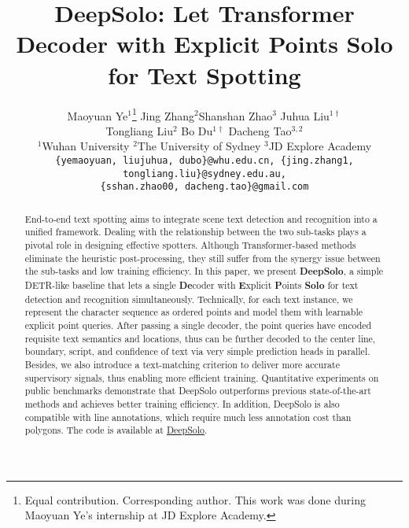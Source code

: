 \documentclass[10pt,twocolumn,letterpaper]{article}
\newcommand{\authorskip}{\hspace{8mm}}
\begin{document}
\title{
DeepSolo: Let Transformer Decoder with Explicit Points Solo for Text Spotting
}

\author{
  Maoyuan Ye$^{1}$\thanks{Equal contribution. \dag Corresponding author. This work was done during Maoyuan Ye's internship at JD Explore Academy.} \authorskip Jing Zhang$^{2}$\footnotemark[1] \authorskip Shanshan Zhao$^{3}$ \authorskip Juhua Liu$^{1\dag}$\\
  Tongliang Liu$^{2}$ \authorskip Bo Du$^{1\dag}$ \authorskip Dacheng Tao$^{3,2}$\\
  $^{1}$Wuhan University \quad $^{2}$The University of Sydney \quad $^{3}$JD Explore Academy\\
  {\tt\small \{yemaoyuan, liujuhua, dubo\}@whu.edu.cn, \{jing.zhang1, tongliang.liu\}@sydney.edu.au,}\\
  {\tt\small \{sshan.zhao00, dacheng.tao\}@gmail.com}
}

\maketitle

\begin{abstract}
   End-to-end text spotting aims to integrate scene text detection and recognition into a unified framework. Dealing with the relationship between the two sub-tasks plays a pivotal role in designing effective spotters. Although Transformer-based methods eliminate the heuristic post-processing, they still suffer from the synergy issue between the sub-tasks and low training efficiency. In this paper, we present \textbf{DeepSolo}, a simple DETR-like baseline that lets a single \textbf{De}coder with \textbf{E}xplicit \textbf{P}oints \textbf{Solo} for text detection and recognition simultaneously. Technically, for each text instance, we represent the character sequence as ordered points and model them with learnable explicit point queries. After passing a single decoder, the point queries have encoded requisite text semantics and locations, thus can be further decoded to the center line, boundary, script, and confidence of text via very simple prediction heads in parallel. Besides, we also introduce a text-matching criterion to deliver more accurate supervisory signals, thus enabling more efficient training. Quantitative experiments on public benchmarks demonstrate that DeepSolo outperforms previous state-of-the-art methods and achieves better training efficiency. In addition, DeepSolo is also compatible with line annotations, which require much less annotation cost than polygons. The code is available at \href{https://github.com/ViTAE-Transformer/DeepSolo}{DeepSolo}.
\end{abstract}
\end{document}

